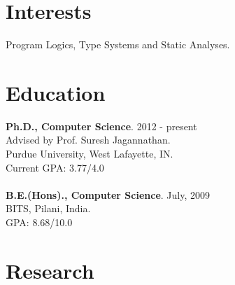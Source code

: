 \documentclass[margin,line]{res}
\begin{document}
 
 
 
\address{http://gowthamk.github.io \hspace{1.25in} gkaki@purdue.edu
          \hspace{1.25in} (201) 417 1775 }

 
\begin{resume} 
 
\section{Interests} 
Program Logics, Type Systems and Static Analyses.

\section{Education} 
{\bf Ph.D., Computer Science}. \hfill 2012 - present\\
Advised by Prof. Suresh Jagannathan.\\
Purdue University, West Lafayette, IN.\\
Current GPA: 3.77/4.0 \\
\\
{\bf B.E.(Hons)., Computer Science}. \hfill July, 2009\\
BITS, Pilani, India.\\
GPA: 8.68/10.0
 

\section{Research}


\end{resume}
\end{document}
